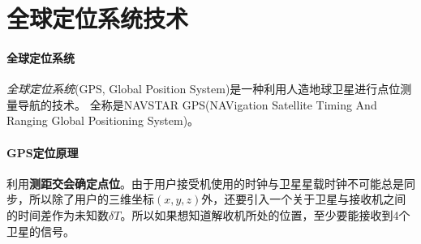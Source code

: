 \section{全球定位系统技术} %
\paragraph{全球定位系统}\textit{全球定位系统}(GPS, Global Position System)是一种利用人造地球卫星进行点位测量导航的技术。
全称是NAVSTAR GPS(NAVigation Satellite Timing And Ranging Global Positioning System)。

\paragraph{GPS定位原理}利用\textbf{测距交会确定点位}。由于用户接受机使用的时钟与卫星星载时钟不可能总是同步，所以除了用户的三维坐标$ (x,y,z) $外，还要引入一个关于卫星与接收机之间的时间差作为未知数$ \delta T $。所以如果想知道解收机所处的位置，至少要能接收到4个卫星的信号。

